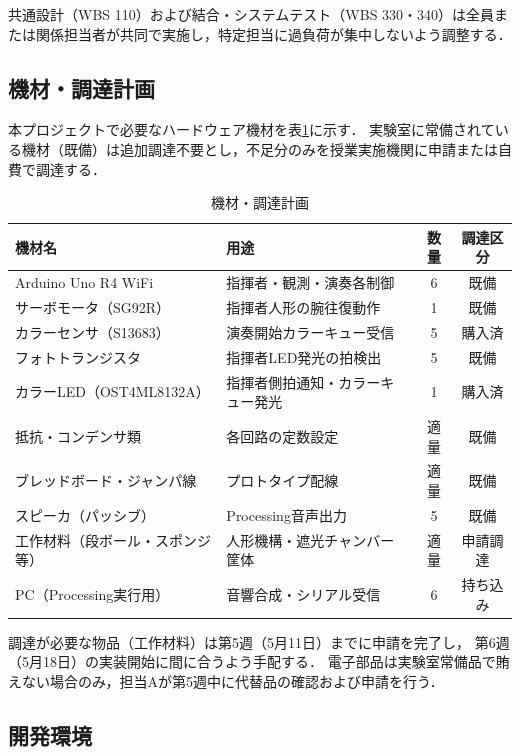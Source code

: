共通設計（WBS 110）および結合・システムテスト（WBS 330・340）は全員または関係担当者が共同で実施し，特定担当に過負荷が集中しないよう調整する．

\subsection{機材・調達計画}

本プロジェクトで必要なハードウェア機材を表\ref{tab:procurement}に示す．
実験室に常備されている機材（既備）は追加調達不要とし，不足分のみを授業実施機関に申請または自費で調達する．

\begin{table}[H]
  \centering
  \caption{機材・調達計画}
  \label{tab:procurement}
  \begin{tabularx}{\linewidth}{Xlcc}
    \toprule
    機材名 & 用途 & 数量 & 調達区分 \\
    \midrule
    Arduino Uno R4 WiFi & 指揮者・観測・演奏各制御 & 6 & 既備 \\
    サーボモータ（SG92R） & 指揮者人形の腕往復動作 & 1 & 既備 \\
    カラーセンサ（S13683） & 演奏開始カラーキュー受信 & 5 & 購入済 \\
    フォトトランジスタ & 指揮者LED発光の拍検出 & 5 & 既備 \\
    カラーLED（OST4ML8132A） & 指揮者側拍通知・カラーキュー発光 & 1 & 購入済 \\
    抵抗・コンデンサ類 & 各回路の定数設定 & 適量 & 既備 \\
    ブレッドボード・ジャンパ線 & プロトタイプ配線 & 適量 & 既備 \\
    スピーカ（パッシブ）& Processing音声出力 & 5 & 既備 \\
    工作材料（段ボール・スポンジ等） & 人形機構・遮光チャンバー筐体 & 適量 & 申請調達 \\
    PC（Processing実行用） & 音響合成・シリアル受信 & 6 & 持ち込み \\
    \bottomrule
  \end{tabularx}
\end{table}

調達が必要な物品（工作材料）は第5週（5月11日）までに申請を完了し，
第6週（5月18日）の実装開始に間に合うよう手配する．
電子部品は実験室常備品で賄えない場合のみ，担当Aが第5週中に代替品の確認および申請を行う．

\subsection{開発環境}


